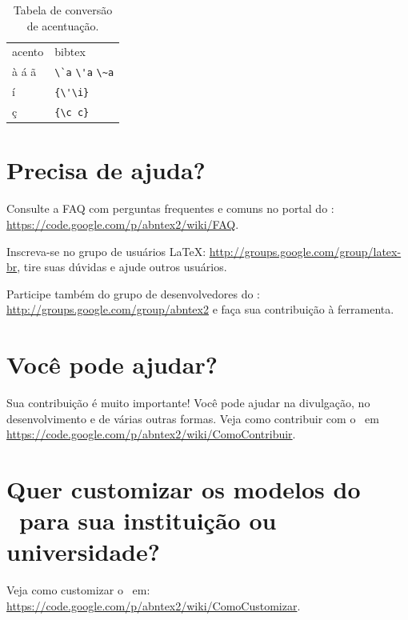 \begin{table}[htbp]
\caption{Tabela de conversão de acentuação.}
\label{tabela-acentos}

\begin{center}
\begin{tabular}{ll}\hline\hline
acento & \textsf{bibtex}\\
à á ã & \verb+\`a+ \verb+\'a+ \verb+\~a+\\
í & \verb+{\'\i}+\\
ç & \verb+{\c c}+\\
\hline\hline
\end{tabular}
\end{center}
\end{table}


\section{Precisa de ajuda?}

Consulte a FAQ com perguntas frequentes e comuns no portal do \abnTeX:
\url{https://code.google.com/p/abntex2/wiki/FAQ}.

Inscreva-se no grupo de usuários \LaTeX:
\url{http://groups.google.com/group/latex-br}, tire suas dúvidas e ajude
outros usuários.

Participe também do grupo de desenvolvedores do \abnTeX:
\url{http://groups.google.com/group/abntex2} e faça sua contribuição à
ferramenta.

\section{Você pode ajudar?}

Sua contribuição é muito importante! Você pode ajudar na divulgação, no
desenvolvimento e de várias outras formas. Veja como contribuir com o \abnTeX\
em \url{https://code.google.com/p/abntex2/wiki/ComoContribuir}.

\section{Quer customizar os modelos do \abnTeX\ para sua instituição ou
universidade?}

Veja como customizar o \abnTeX\ em:
\url{https://code.google.com/p/abntex2/wiki/ComoCustomizar}.

